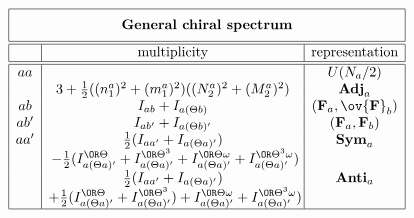 \begin{equation*}
      \begin{array}{|c|c|c|} \hline
        \multicolumn{3}{|c|}{\rule[-3mm]{0mm}{8mm} 
\text{\bf General chiral spectrum}} \\ \hline\hline
       & \text{multiplicity} & \text{representation}
\\ \hline\hline
aa  & & U(N_a/2)\\
 &  3+\frac{1}{2}((n^a_1)^2+(m^a_1)^2)((N^a_2)^2+(M^a_2)^2) & {\bf Adj}_a \\
ab  & I_{ab} + I_{ a(\Theta b)} & ({\bf F}_a,\ov{\bf F}_b)\\
ab' & I_{ab'} + I_{a(\Theta b)'} & ({\bf F}_a,{\bf F}_b)\\
aa' & \frac{1}{2}(I_{aa'}+I_{a(\Theta a)'})  & {\bf Sym}_a\\
&-\frac{1}{2}(I^{\OR\Theta}_{a(\Theta a)'}+I^{\OR\Theta^3}_{a(\Theta a)'}
+I^{\OR\Theta\omega}_{a(\Theta a)'}+I^{\OR\Theta^3\omega}_{a(\Theta a)'})\!\! & \\
 &  \frac{1}{2}(I_{aa'}+I_{a(\Theta a)'})  & {\bf Anti}_a\\
&+\frac{1}{2}(I^{\OR\Theta}_{a(\Theta a)'}+I^{\OR\Theta^3}_{a(\Theta a)'}) 
+I^{\OR\Theta\omega}_{a(\Theta a)'}+I^{\OR\Theta^3\omega}_{a(\Theta a)'})\!\! & 
\\\hline 
      \end{array}
    \end{equation*}

